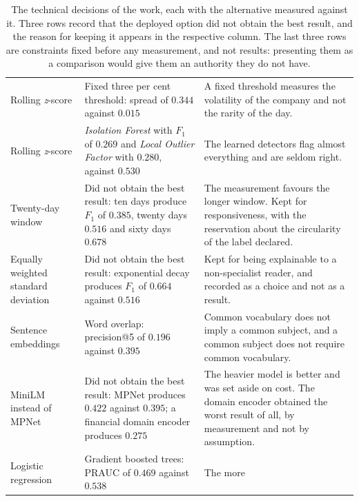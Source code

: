 \begin{table}[!htbp]
\caption[Each choice, against the alternative that did not stay]{The technical decisions of the
work, each with the alternative measured against it. Three rows record that the deployed option did
not obtain the best result, and the reason for keeping it appears in the respective column. The
last three rows are constraints fixed before any measurement, and not results: presenting them as a
comparison would give them an authority they do not have.}
\label{tab:av_alternativas}
\centering
\scriptsize
\begin{tabular}{L{0.19\textwidth} L{0.30\textwidth} L{0.39\textwidth}}
\toprule
{} &  &  \\
\midrule
Rolling \emph{z}-score & Fixed three per cent threshold: spread of $0.344$ against $0.015$ &
A fixed threshold measures the volatility of the company and not the rarity of the day. \\
\addlinespace
Rolling \emph{z}-score & \emph{Isolation Forest} with $F_1$ of $0.269$ and \emph{Local Outlier
Factor} with $0.280$, against $0.530$ & The learned detectors flag almost everything and are
seldom right. \\
\addlinespace
Twenty-day window & Did not obtain the best result: ten days produce $F_1$ of $0.385$, twenty days
$0.516$ and sixty days $0.678$ & The measurement favours the longer window. Kept for
responsiveness, with the reservation about the circularity of the label declared. \\
\addlinespace
Equally weighted standard deviation & Did not obtain the best result: exponential decay produces
$F_1$ of $0.664$ against $0.516$ & Kept for being explainable to a non-specialist reader, and
recorded as a choice and not as a result. \\
\addlinespace
Sentence embeddings & Word overlap: precision@5 of $0.196$ against $0.395$ & Common vocabulary does
not imply a common subject, and a common subject does not require common vocabulary. \\
\addlinespace
MiniLM instead of MPNet & Did not obtain the best result: MPNet produces $0.422$ against $0.395$; a
financial domain encoder produces $0.275$ & The heavier model is better and was set aside on cost.
The domain encoder obtained the worst result of all, by measurement and not by assumption. \\
\addlinespace
Logistic regression & Gradient boosted trees: \gls{PRAUC} of $0.469$ against $0.538$ & The more

\end{tabular}
\end{table}
